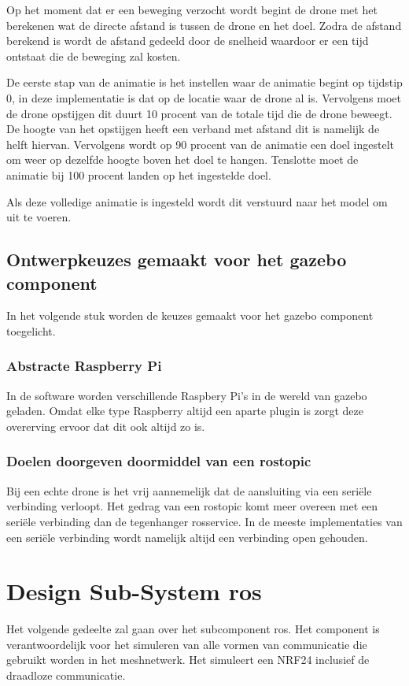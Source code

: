 \documentclass[a4paper, 11pt, oneside]{report}
\begin{document}
Op het moment dat er een beweging verzocht wordt begint de drone met het berekenen wat de directe afstand is tussen de drone en het doel.
Zodra de afstand berekend is wordt de afstand gedeeld door de snelheid waardoor er een tijd ontstaat die de beweging zal kosten.

De eerste stap van de animatie is het instellen waar de animatie begint op tijdstip 0, in deze implementatie is dat op de locatie waar de drone al is.
Vervolgens moet de drone opstijgen dit duurt 10 procent van de totale tijd die de drone beweegt.
De hoogte van het opstijgen heeft een verband met afstand dit is namelijk de helft hiervan.
Vervolgens wordt op 90 procent van de animatie een doel ingestelt om weer op dezelfde hoogte boven het doel te hangen.
Tenslotte moet de animatie bij 100 procent landen op het ingestelde doel.

Als deze volledige animatie is ingesteld wordt dit verstuurd naar het model om uit te voeren.    
 

\subsection{Ontwerpkeuzes gemaakt voor het gazebo component}
\label{DetailedDesign:gazebo:ontwerkeuzes}
In het volgende stuk worden de keuzes gemaakt voor het gazebo component toegelicht.
\subsubsection{Abstracte Raspberry Pi}
In de software worden verschillende Raspbery Pi's in de wereld van gazebo geladen.
Omdat elke type Raspberry altijd een aparte plugin is zorgt deze overerving ervoor dat dit ook altijd zo is.  

\subsubsection{Doelen doorgeven doormiddel van een rostopic}
Bij een echte drone is het vrij aannemelijk dat de aansluiting via een seriële verbinding verloopt.
Het gedrag van een rostopic komt meer overeen met een seriële verbinding dan de tegenhanger rosservice.
In de meeste implementaties van een seriële verbinding wordt namelijk altijd een verbinding open gehouden. 

\section{Design Sub-System ros}
\label{DetailedDesign:WirelessSimulatie}
Het volgende gedeelte zal gaan over het subcomponent ros. Het component is verantwoordelijk voor het simuleren van alle vormen van communicatie die gebruikt worden in het meshnetwerk. Het simuleert een NRF24 inclusief de draadloze communicatie.
\end{document}
